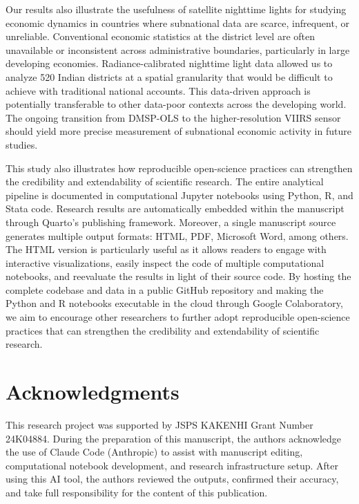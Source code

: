 \documentclass[
  a4paper, 
  twoside,
  review
]{article}
\newcounter{code}
\begin{document}
Our results also illustrate the usefulness of satellite nighttime lights
for studying economic dynamics in countries where subnational data are
scarce, infrequent, or unreliable. Conventional economic statistics at
the district level are often unavailable or inconsistent across
administrative boundaries, particularly in large developing economies.
Radiance-calibrated nighttime light data allowed us to analyze 520
Indian districts at a spatial granularity that would be difficult to
achieve with traditional national accounts. This data-driven approach is
potentially transferable to other data-poor contexts across the
developing world. The ongoing transition from DMSP-OLS to the
higher-resolution VIIRS sensor should yield more precise measurement of
subnational economic activity in future studies.

This study also illustrates how reproducible open-science practices can
strengthen the credibility and extendability of scientific research. The
entire analytical pipeline is documented in computational Jupyter
notebooks using Python, R, and Stata code. Research results are
automatically embedded within the manuscript through Quarto's publishing
framework. Moreover, a single manuscript source generates multiple
output formats: HTML, PDF, Microsoft Word, among others. The HTML
version is particularly useful as it allows readers to engage with
interactive visualizations, easily inspect the code of multiple
computational notebooks, and reevaluate the results in light of their
source code. By hosting the complete codebase and data in a public
GitHub repository and making the Python and R notebooks executable in
the cloud through Google Colaboratory, we aim to encourage other
researchers to further adopt reproducible open-science practices that
can strengthen the credibility and extendability of scientific research.

\section{Acknowledgments}\label{acknowledgments}

This research project was supported by JSPS KAKENHI Grant Number
24K04884. During the preparation of this manuscript, the authors
acknowledge the use of Claude Code (Anthropic) to assist with manuscript
editing, computational notebook development, and research infrastructure
setup. After using this AI tool, the authors reviewed the outputs,
confirmed their accuracy, and take full responsibility for the content
of this publication.
\end{document}
